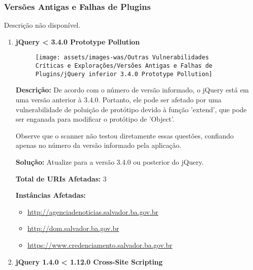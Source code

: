 \documentclass[a4paper,12pt]{article}
\begin{document}
\subsubsection{Versões Antigas e Falhas de Plugins}
Descrição não disponível.

\begin{enumerate}
\item \textbf{jQuery < 3.4.0 Prototype Pollution}

                        \begin{figure}[h!]
                        \centering
                        \texttt{[image: assets/images-was/Outras Vulnerabilidades Críticas e Explorações/Versões Antigas e Falhas de Plugins/jQuery inferior 3.4.0 Prototype Pollution]}
                        \end{figure}
                        \FloatBarrier
                        \textbf{Descrição:} De acordo com o número de versão informado, o jQuery está em uma versão anterior à 3.4.0. Portanto, ele pode ser afetado por uma vulnerabilidade de poluição de protótipo devido à função 'extend', que pode ser enganada para modificar o protótipo de 'Object'.

Observe que o scanner não testou diretamente essas questões, confiando apenas no número da versão informado pela aplicação.

\textbf{Solução:} Atualize para a versão 3.4.0 ou posterior do jQuery.

\textbf{Total de URIs Afetadas:} 3

\textbf{Instâncias Afetadas:}
\begin{itemize}
    \item \url{http://agenciadenoticias.salvador.ba.gov.br}
    \item \url{http://dom.salvador.ba.gov.br}
    \item \url{https://www.credenciamento.salvador.ba.gov.br}
\end{itemize}

\item \textbf{jQuery 1.4.0 < 1.12.0 Cross-Site Scripting}


\end{enumerate}
\end{document}
